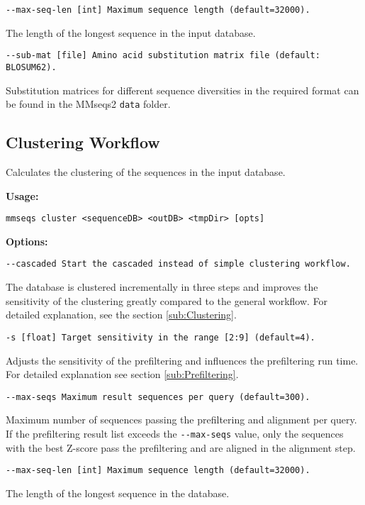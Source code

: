 \documentclass[11pt,a4paper]{scrreprt}
\begin{document}
\texttt{\small -{}-max-seq-len {[}int{]} Maximum sequence length (default=32000).}{\small \par}

The length of the longest sequence in the input database.

\texttt{\small -{}-sub-mat {[}file{]} Amino acid substitution matrix file (default: BLOSUM62).}{\small \par}

Substitution matrices for different sequence diversities in the required format can be found in the MMseqs2 \texttt{data} folder.
\subsection{Clustering Workflow} \label{sub:Clustering-workflow}
Calculates the clustering of the sequences in the input database. 

\textbf{Usage:}

\texttt{mmseqs cluster  <sequenceDB> <outDB> <tmpDir> {[}opts{]}}

\textbf{Options:}

\texttt{\small -{}-cascaded Start the cascaded instead of simple clustering workflow.}{\small \par}

The database is clustered incrementally in three steps and improves the sensitivity of the clustering greatly compared to the general workflow. For detailed explanation, see the section \ref{sub:Clustering}.

\texttt{\small -s {[}float{]} Target sensitivity in the range {[}2:9{]} (default=4).}{\small \par}

Adjusts the sensitivity of the prefiltering and influences the prefiltering run time. For detailed explanation see section \ref{sub:Prefiltering}.

\texttt{\small -{}-max-seqs Maximum result sequences per query (default=300).}{\small \par}

Maximum number of sequences passing the prefiltering and alignment per query. If the prefiltering result list exceeds the \texttt{-{}-max-seqs} value, only the sequences with the best Z-score pass the prefiltering and are aligned in the alignment step.

\texttt{\small -{}-max-seq-len {[}int{]} Maximum sequence length (default=32000).}{\small \par}

The length of the longest sequence in the database.
\end{document}
